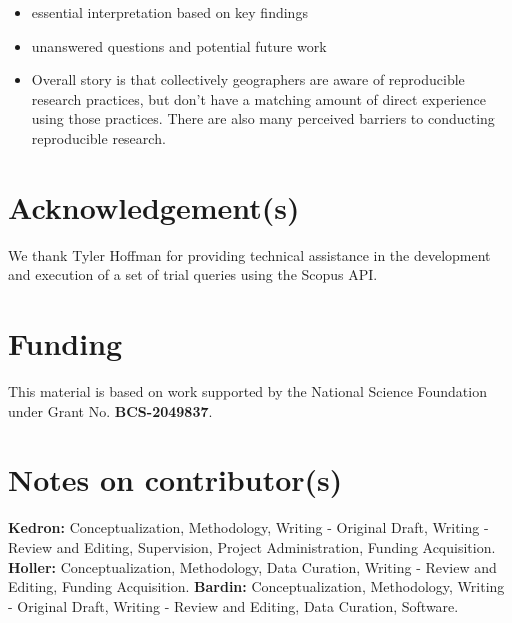 \documentclass[]{interact}
\theoremstyle{plain}%
\theoremstyle{definition}
\theoremstyle{remark}
\begin{document}
\begin{itemize}
    \item essential interpretation based on key findings
    \item unanswered questions and potential future work
    \item Overall story is that collectively geographers are aware of reproducible research practices, but don't have a matching amount of direct experience using those practices. There are also many perceived barriers to conducting reproducible research.
\end{itemize}

\theendnotes


\section*{Acknowledgement(s)}
We thank Tyler Hoffman for providing technical assistance in the development and execution of a set of trial queries using the Scopus API.

\section*{Funding}
This material is based on work supported by the National Science Foundation under Grant No. \textbf{BCS-2049837}.

\section*{Notes on contributor(s)}
\textbf{Kedron:} Conceptualization, Methodology, Writing - Original Draft, Writing - Review and Editing, Supervision, Project Administration, Funding Acquisition. \textbf{Holler:} Conceptualization, Methodology, Data Curation, Writing - Review and Editing, Funding Acquisition. \textbf{Bardin:} Conceptualization, Methodology, Writing - Original Draft, Writing - Review and Editing, Data Curation, Software.
\end{document}
